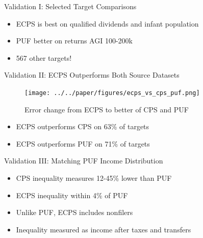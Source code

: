 \documentclass{beamer}
\begin{document}
\begin{frame}{Validation I: Selected Target Comparisons}
    \begin{table}
        \small
        \centering
        
    \end{table}
    \begin{itemize}
        \item ECPS is best on qualified dividends and infant population
        \item PUF better on returns AGI 100-200k
        \item 567 other targets!
    \end{itemize}
\end{frame}

\begin{frame}{Validation II: ECPS Outperforms Both Source Datasets}
    \begin{figure}
        \centering
        \texttt{[image: ../../paper/figures/ecps\_vs\_cps\_puf.png]}
        \caption{Error change from ECPS to better of CPS and PUF}
    \end{figure}
    \begin{itemize}
        \item ECPS outperforms CPS on 63\% of targets
        \item ECPS outperforms PUF on 71\% of targets
    \end{itemize}
\end{frame}

\begin{frame}{Validation III: Matching PUF Income Distribution}
    \begin{table}
        \centering
        
    \end{table}
    \begin{itemize}
        \item CPS inequality measures 12-45\% lower than PUF
        \item ECPS inequality within 4\% of PUF
        \item Unlike PUF, ECPS includes nonfilers
        \item Inequality measured as income after taxes and transfers
    \end{itemize}
\end{frame}
\end{document}
